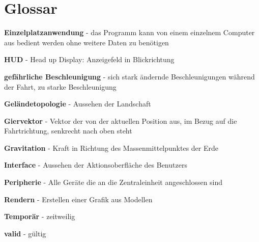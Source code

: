 
\chapter{Glossar}

\textbf{Einzelplatzanwendung} - das Programm kann von einem einzelnem Computer aus bedient werden ohne weitere Daten zu benötigen

\textbf{HUD}  - Head up Display: Anzeigefeld in Blickrichtung

\textbf{gefährliche Beschleunigung} - sich stark ändernde Beschleunigungen während der Fahrt, zu starke Beschleunigung

\textbf{Geländetopologie} - Aussehen der Landschaft

\textbf{Giervektor} - Vektor der von der aktuellen Position aus, im Bezug auf die Fahrtrichtung, senkrecht nach oben steht

\textbf{Gravitation} - Kraft in Richtung des Massenmittelpunktes der Erde

\textbf{Interface} - Aussehen der Aktionsoberfläche des Benutzers 

\textbf{Peripherie} - Alle Geräte die an die Zentraleinheit angeschlossen sind

\textbf{Rendern} - Erstellen einer Grafik aus Modellen

\textbf{Temporär} - zeitweilig

\textbf{valid} - gültig


%

